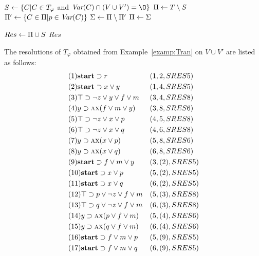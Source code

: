 \documentclass[letterpaper]{article}
\begin{document}
\begin{algorithm}[!h]
\caption{$\emph{Resolution}(T,V \cup V')$}%
\label{alg:compute:Res}

$S\leftarrow \{C | C\in T_{\varphi}$ and $\Var(C) \cap (V\cup V')= {\O}\}$\;
$\Pi\leftarrow T\setminus S$ \;
 {
    $\Pi'\leftarrow \{C \in \Pi| p\in \textit{Var}(C)\}$ \;
    $\Sigma \leftarrow \Pi \setminus \Pi'$\;
     {
    }
    $\Pi\leftarrow \Sigma$\;
}

$Res\leftarrow \Pi \cup S$\;
\Return $Res$\;
\end{algorithm}


\begin{example}\label{examp:Res}
The resolutions of $T_{\varphi}$ obtained from Example~\ref{examp:Tran} on $V\cup V'$ are listed as follows:
\begin{align*}
&(1) \textbf{start} \supset r && (1,2,SRES 5)\\
&(2) \textbf{start} \supset x \vee y && (1,4,SRES 5)\\
&(3) \top \supset \neg z \vee y \vee f \vee m && (3, 4, SRES 8)\\
&(4) y \supset \textsc{a}\textsc{x}(f\vee m\vee y) && (3,8, SRES 6)\\
&(5) \top \supset \neg z \vee x \vee p && (4,5, SRES 8)\\
&(6) \top \supset \neg z \vee x \vee q && (4,6, SRES 8)\\
&(7) y \supset \textsc{a}\textsc{x}(x\vee p) && (5, 8, SRES 6)\\
&(8) y \supset \textsc{a}\textsc{x}(x\vee q) && (6, 8, SRES 6)\\
&(9) \textbf{start} \supset f\vee m \vee y && (3,(2), SRES 5) \\
&(10) \textbf{start} \supset x \vee p && (5,(2),SRES 5) \\
&(11) \textbf{start} \supset x \vee q && (6,(2), SRES 5)\\
&(12) \top \supset p \vee \neg z \vee f \vee m && (5,(3), SRES 8)\\
&(13) \top \supset q \vee \neg z \vee f \vee m && (6,(3), SRES 8)\\
&(14) y \supset \textsc{a}\textsc{x}(p \vee f\vee m) && (5, (4), SRES 6) \\
&(15) y \supset \textsc{a}\textsc{x}(q \vee f\vee m) && (6, (4), SRES 6) \\
&(16) \textbf{start} \supset f\vee m \vee p && (5, (9), SRES 5) \\
&(17) \textbf{start} \supset f\vee m \vee q && (6, (9), SRES 5)
\end{align*}
\end{example}
\end{document}
